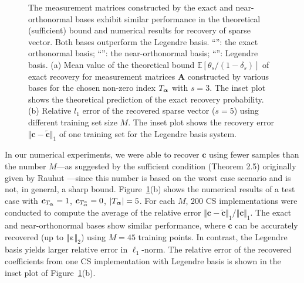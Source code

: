 \begin{figure}[tbp]
  \center
  \caption{The measurement matrices constructed by the exact and near-orthonormal bases exhibit similar performance
  in the theoretical (sufficient) bound and numerical results for  recovery of sparse vector. 
   Both bases outperform the Legendre basis.
  ``\textcolor{red}{\protect\rectanglesolidline}'': the exact orthonormal  basis;  
  ``\textcolor{green}{\protect\triangledashline}'': the near-orthonormal  basis;  
  ``\textcolor{blue}{\protect\diamonddashdotline}'': Legendre basis.
  (a) Mean value of the theoretical bound $\mathbb{E}\left[\theta_s/\left(1-\delta_s\right)\right]$ of exact recovery 
  for measurement matrices $\bm A$ constructed by various bases for the chosen non-zero index $T_{\bm\alpha}$ with $s = 3$.
  The inset plot shows the theoretical prediction of the exact recovery probability.
  (b) Relative $l_1$ error of the recovered sparse vector ($s = 5$) using different training set size $M$.
  The inset plot shows the recovery error $\Vert \bm c - \tilde{\bm c}\Vert_1$ of one training set for the Legendre basis system.} \label{fig:err_sparse_vector}
\end{figure}

In our numerical experiments, we were able to recover $\bm c$ using fewer samples
than the number {\color{blue} $M$---as suggested by the sufficient condition (Theorem 2.5) originally given} by Rauhut
\cite{Rauhut_2012sparseLegen}---since this number is based on the worst case scenario and is not, in general, a sharp bound.
Figure~\ref{fig:err_sparse_vector}(b) shows the numerical results of a test case with $\bm c_{T_{\bm\alpha}} = 1$, $\bm c_{T_{\bm\alpha}^c} = 0$, $\vert T_{\bm\alpha} \vert = 5$. 
For each $M$, $200$ CS implementations were conducted to compute the average of the relative error $\Vert \bm c - \tilde{\bm c}\Vert_1/ \Vert \bm c \Vert_1$.
The exact and near-orthonormal  bases show similar performance, where $\bm c$ can be accurately recovered (up to $\Vert\bm \varepsilon \Vert_2$) using $M = 45$ training points.
In contrast, the Legendre basis yields larger relative error in $\ell_1$-norm. The relative error of the recovered coefficients from one CS implementation with Legendre basis is shown in the inset plot of Figure~\ref{fig:err_sparse_vector}(b).

